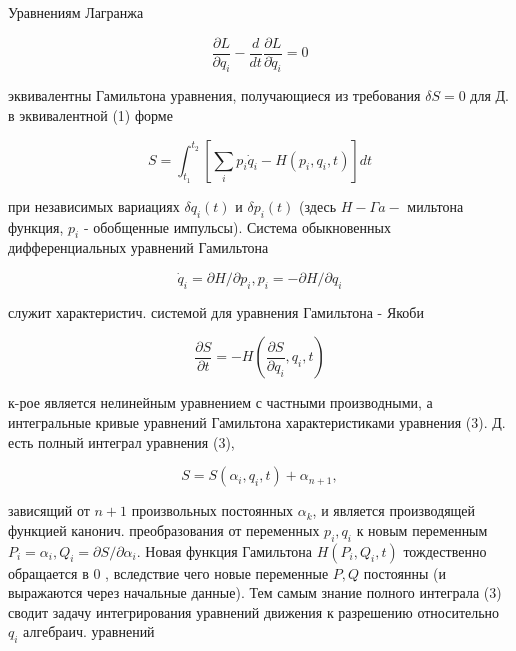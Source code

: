 \documentclass[10pt]{article}
\begin{document}
Уравнениям Лагранжа



\[

\frac{\partial L}{\partial q_{i}}-\frac{d}{d t} \frac{\partial L}{\partial \dot{q}_{i}}=0

\]



эквивалентны Гамильтона уравнения, получающиеся из требования $\delta S=0$ для Д. в эквивалентной (1) форме



\[

S=\int_{t_{1}}^{t_{2}}\left[\sum_{i} p_{i} \dot{q}_{i}-H\left(p_{i}, q_{i}, t\right)\right] d t

\]



при независимых вариациях $\delta q_{i}(t)$ и $\delta p_{i}(t)$ (здесь $H-\Gamma a-$ мильтона функция, $p_{i}$ - обобщенные импульсы). Система обыкновенных дифференциальных уравнений Гамильтона



\[

\dot{q}_{i}=\partial H / \partial p_{i}, p_{i}=-\partial H / \partial q_{i}

\]



служит характеристич. системой для уравнения Гамильтона - Якоби



\[

\frac{\partial S}{\partial t}=-H\left(\frac{\partial S}{\partial q_{i}}, q_{i}, t\right)

\]



к-рое является нелинейным уравнением с частными производными, а интегральные кривые уравнений Гамильтона характеристиками уравнения (3). Д. есть полный интеграл уравнения (3),



\[

S=S\left(\alpha_{i}, q_{i}, t\right)+\alpha_{n+1},

\]



зависящий от $n+1$ произвольных постоянных $\alpha_{k}$, и является производящей функцией канонич. преобразования от переменных $p_{i}, q_{i}$ к новым переменным $P_{i}=\alpha_{i}, Q_{i}=\partial S / \partial \alpha_{i}$. Новая функция Гамильтона $H\left(P_{i}, Q_{i}, t\right)$ тождественно обращается в 0 , вследствие чего новые переменные $P, Q$ постоянны (и выражаются через начальные данные). Тем самым знание полного интеграла (3) сводит задачу интегрирования уравнений движения к разрешению относительно $q_{i}$ алгебраич. уравнений
\end{document}
